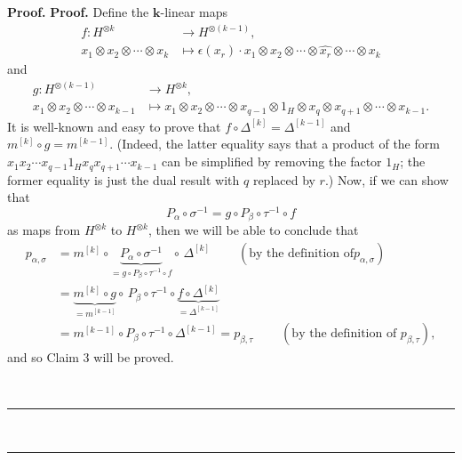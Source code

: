 \documentclass[numbers=enddot,12pt,final,onecolumn,notitlepage]{scrartcl}%
\theoremstyle{definition}
\newenvironment{fineprint}{\begin{small}}{\end{small}}
\newenvironment{proof}[1][Proof]{\noindent\textbf{#1.} }{\ \rule{0.5em}{0.5em}}
\begin{document}
\begin{fineprint}
\begin{proof}
\begin{proof}
Define the $\mathbf{k}$-linear maps%
\begin{align*}
f:H^{\otimes k}  &  \rightarrow H^{\otimes\left(  k-1\right)  },\\
x_{1}\otimes x_{2}\otimes\cdots\otimes x_{k}  &  \mapsto\epsilon\left(
x_{r}\right)  \cdot x_{1}\otimes x_{2}\otimes\cdots\otimes\widehat{x_{r}%
}\otimes\cdots\otimes x_{k}%
\end{align*}
and
\begin{align*}
g:H^{\otimes\left(  k-1\right)  }  &  \rightarrow H^{\otimes k},\\
x_{1}\otimes x_{2}\otimes\cdots\otimes x_{k-1}  &  \mapsto x_{1}\otimes
x_{2}\otimes\cdots\otimes x_{q-1}\otimes1_{H}\otimes x_{q}\otimes
x_{q+1}\otimes\cdots\otimes x_{k-1}.
\end{align*}
It is well-known and easy to prove that $f\circ\Delta^{\left[  k\right]
}=\Delta^{\left[  k-1\right]  }$ and $m^{\left[  k\right]  }\circ g=m^{\left[
k-1\right]  }$. (Indeed, the latter equality says that a product of the form
$x_{1}x_{2}\cdots x_{q-1}1_{H}x_{q}x_{q+1}\cdots x_{k-1}$ can be simplified by
removing the factor $1_{H}$; the former equality is just the dual result with
$q$ replaced by $r$.) Now, if we can show that%
\begin{equation}
P_{\alpha}\circ\sigma^{-1}=g\circ P_{\beta}\circ\tau^{-1}\circ f
\label{pf.prop.mopis.reduce.c2-mid}%
\end{equation}
as maps from $H^{\otimes k}$ to $H^{\otimes k}$, then we will be able to
conclude that
\begin{align*}
p_{\alpha,\sigma}  &  =m^{\left[  k\right]  }\circ\underbrace{P_{\alpha}%
\circ\sigma^{-1}}_{=g\circ P_{\beta}\circ\tau^{-1}\circ f}\circ\,\Delta
^{\left[  k\right]  }\ \ \ \ \ \ \ \ \ \ \left(  \text{by the definition of
}p_{\alpha,\sigma}\right) \\
&  =\underbrace{m^{\left[  k\right]  }\circ g}_{=m^{\left[  k-1\right]  }%
}\circ\,P_{\beta}\circ\tau^{-1}\circ\underbrace{f\circ\Delta^{\left[
k\right]  }}_{=\Delta^{\left[  k-1\right]  }}\\
&  =m^{\left[  k-1\right]  }\circ P_{\beta}\circ\tau^{-1}\circ\Delta^{\left[
k-1\right]  }=p_{\beta,\tau}\ \ \ \ \ \ \ \ \ \ \left(  \text{by the
definition of }p_{\beta,\tau}\right)  ,
\end{align*}
and so Claim 3 will be proved.


\end{proof}
\end{proof}
\end{fineprint}
\end{document}
